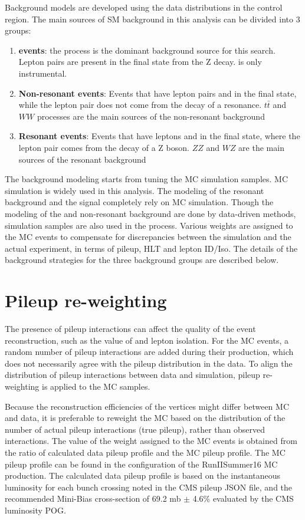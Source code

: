 Background models are developed using the data distributions in the control region. The main sources of SM background in this analysis can be divided into 3 groups:
\begin{enumerate}
\item \textbf{\boldmath{\Zjets} events}: the \Zjets process is the dominant background source for this search. Lepton pairs are present in the final state from the Z decay. \ptmiss is only instrumental.
\item \textbf{Non-resonant events}: Events that have lepton pairs and \ptmiss in the final state, while the lepton pair does not come from the decay of a resonance. $t\bar{t}$ and $WW$ processes are the main sources of the non-resonant background
\item \textbf{Resonant events}: Events that have leptons and \ptmiss in the final state, where the lepton pair comes from the decay of a Z boson. $ZZ$ and $WZ$ are the main sources of the resonant background
\end{enumerate}

\vspace{0.3cm}
The background modeling starts from tuning the MC simulation samples. MC simulation is widely used in this analysis. The modeling of the resonant background and the signal completely rely on MC simulation. Though the modeling of the \Zjets and non-resonant background are done by data-driven methods, simulation samples are also used in the process. Various weights are assigned to the MC events to compensate for discrepancies between the simulation and the actual experiment, in terms of pileup, HLT and lepton ID/Iso. The details of the background strategies for the three background groups are described below.

\section{Pileup re-weighting}
The presence of pileup interactions can affect the quality of the event reconstruction, such as the value of \ptmiss and lepton isolation. For the MC events, a random number of pileup interactions are added during their production, which does not necessarily agree with the pileup distribution in the data. To align the distribution of pileup interactions between data and simulation, pileup re-weighting is applied to the MC samples. 

\vspace{0.3cm}
Because the reconstruction efficiencies of the vertices might differ between MC and data, it is preferable to reweight the MC based on the distribution of the number of actual pileup interactions (true pileup), rather than observed interactions. The value of the weight assigned to the MC events is obtained from the ratio of calculated data pileup profile and the MC pileup profile. The MC pileup profile can be found in the configuration of the RunIISummer16 MC production. The calculated data pileup profile is based on the instantaneous luminosity for each bunch crossing noted in the CMS pileup JSON file, and the recommended Mini-Bias cross-section of 69.2 mb $\pm$ 4.6\% evaluated by the CMS luminosity POG.

